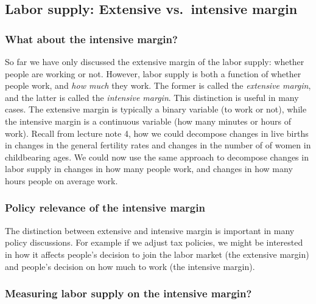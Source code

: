 \documentclass[]{book}
\begin{document}
\hypertarget{labor-supply-extensive-vs.-intensive-margin}{%
\subsection{Labor supply: Extensive vs.~intensive margin}\label{labor-supply-extensive-vs.-intensive-margin}}

\hypertarget{what-about-the-intensive-margin}{%
\subsubsection{What about the intensive margin?}\label{what-about-the-intensive-margin}}

So far we have only discussed the extensive margin of the labor supply: whether people are working or not. However, labor supply is both a function of whether people work, and \emph{how much} they work. The former is called the \emph{extensive margin}, and the latter is called the \emph{intensive margin}. This distinction is useful in many cases. The extensive margin is typically a binary variable (to work or not), while the intensive margin is a continuous variable (how many minutes or hours of work). Recall from lecture note 4, how we could decompose changes in live births in changes in the general fertility rates and changes in the number of of women in childbearing ages. We could now use the same approach to decompose changes in labor supply in changes in how many people work, and changes in how many hours people on average work.

\hypertarget{policy-relevance-of-the-intensive-margin}{%
\subsubsection{Policy relevance of the intensive margin}\label{policy-relevance-of-the-intensive-margin}}

The distinction between extensive and intensive margin is important in many policy discussions. For example if we adjust tax policies, we might be interested in how it affects people's decision to join the labor market (the extensive margin) and people's decision on how much to work (the intensive margin).

\hypertarget{measuring-labor-supply-on-the-intensive-margin}{%
\subsubsection{Measuring labor supply on the intensive margin?}\label{measuring-labor-supply-on-the-intensive-margin}}
\end{document}
